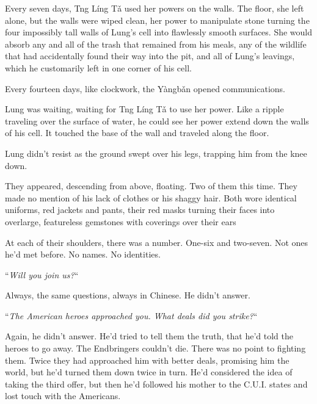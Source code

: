 Every seven days, Tng L\'{i}ng T\v{a} used her powers on the walls.  The floor, she left alone, but the walls were wiped clean, her power to manipulate stone turning the four impossibly tall walls of Lung's cell into flawlessly smooth surfaces.  She would absorb any and all of the trash that remained from his meals, any of the wildlife that had accidentally found their way into the pit, and all of Lung's leavings, which he customarily left in one corner of his cell.



Every fourteen days, like clockwork, the Y\`{a}ngb\v{a}n opened communications.



Lung was waiting, waiting for Tng L\'{i}ng T\v{a} to use her power.  Like a ripple traveling over the surface of water, he could see her power extend down the walls of his cell.  It touched the base of the wall and traveled along the floor.



Lung didn't resist as the ground swept over his legs, trapping him from the knee down.



They appeared, descending from above, floating.  Two of them this time.  They made no mention of his lack of clothes or his shaggy hair.  Both wore identical uniforms, red jackets and pants, their red masks turning their faces into overlarge, featureless gemstones with coverings over their ears



At each of their shoulders, there was a number.  One-six and two-seven.\emph{  }Not ones he'd met before.  No names.  No identities.



``\emph{Will you join us?}``



Always, the same questions, always in Chinese.  He didn't answer.



``\emph{The American heroes approached you.  What deals did you strike?}``



Again, he didn't answer.  He'd tried to tell them the truth, that he'd told the heroes to go away.  The Endbringers couldn't die.  There was no point to fighting them.  Twice they had approached him with better deals, promising him the world, but he'd turned them down twice in turn.  He'd considered the idea of taking the third offer, but then he'd followed his mother to the C.U.I. states and lost touch with the Americans.



